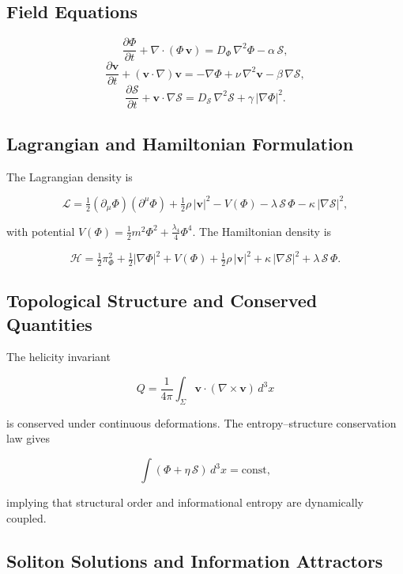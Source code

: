 \documentclass[12pt,a4paper]{article}
\begin{document}
\subsection*{Field Equations}

\[
\frac{\partial\Phi}{\partial t} + \nabla\cdot(\Phi\,\mathbf{v})
= D_\Phi\,\nabla^2\Phi - \alpha\,\mathcal{S},
\]
\[
\frac{\partial\mathbf{v}}{\partial t} + (\mathbf{v}\cdot\nabla)\mathbf{v}
= -\nabla\Phi + \nu\,\nabla^2\mathbf{v} - \beta\,\nabla\mathcal{S},
\]
\[
\frac{\partial\mathcal{S}}{\partial t} + \mathbf{v}\cdot\nabla\mathcal{S}
= D_\mathcal{S}\,\nabla^2\mathcal{S} + \gamma\,|\nabla\Phi|^2.
\]

\subsection*{Lagrangian and Hamiltonian Formulation}

The Lagrangian density is

\[
\mathcal{L}
= \tfrac{1}{2}(\partial_\mu\Phi)(\partial^\mu\Phi)
+ \tfrac{1}{2}\rho\,|\mathbf{v}|^2
- V(\Phi)
- \lambda\,\mathcal{S}\,\Phi
- \kappa\,|\nabla\mathcal{S}|^2,
\]

with potential $V(\Phi) = \tfrac{1}{2}m^2\Phi^2 + \tfrac{\lambda_4}{4}\Phi^4$. The
Hamiltonian density is

\[
\mathcal{H}
= \tfrac{1}{2}\pi_\Phi^2
+ \tfrac{1}{2}|\nabla\Phi|^2
+ V(\Phi)
+ \tfrac{1}{2}\rho\,|\mathbf{v}|^2
+ \kappa\,|\nabla\mathcal{S}|^2
+ \lambda\,\mathcal{S}\,\Phi.
\]

\subsection*{Topological Structure and Conserved Quantities}

The helicity invariant

\[
Q = \frac{1}{4\pi}\int_\Sigma \mathbf{v}\cdot(\nabla\times\mathbf{v})\,d^3x
\]

is conserved under continuous deformations. The entropy--structure conservation law gives

\[
\int (\Phi + \eta\,\mathcal{S})\,d^3x = \mathrm{const},
\]

implying that structural order and informational entropy are dynamically coupled.

\subsection*{Soliton Solutions and Information Attractors}
\end{document}
